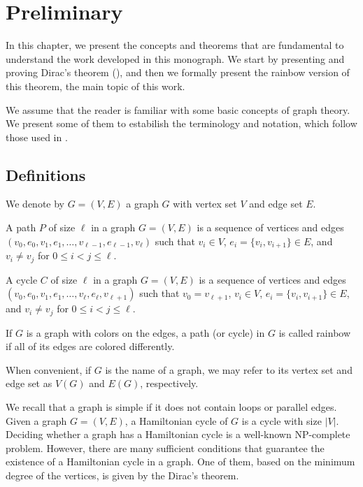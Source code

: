 
\chapter{Preliminary}

In this chapter, we present the concepts and theorems that are fundamental to understand the 
work developed in this monograph. We start by presenting and proving Dirac's theorem
(\cite{dirac1952}), 
and then we formally present the rainbow version of this theorem, the main topic of this work.

We assume that the reader is familiar with some basic concepts of graph theory. We present some 
of them to estabilish the terminology and notation, which follow those used in 
\cite{bondy1976}.

\section{Definitions}

We denote by $G = (V, E)$ a graph $G$ with vertex set $V$ and edge set $E$.

A path $P$ of size $\ell$ in a graph $G = (V, E)$ is a sequence of vertices and edges $(v_0, e_0, v_1, e_1, \ldots, v_{\ell - 1}, e_{\ell - 1}, v_{\ell})$ such that
$v_i \in V$, $e_i = \{v_i, v_{i + 1}\} \in E$, and $v_i \neq v_j$ for $0 \leq i < j \leq \ell$.

A cycle $C$ of size $\ell$ in a graph $G = (V, E)$ is a sequence of vertices and edges $(v_0, e_0, v_1, e_1, \ldots, v_{\ell}, e_{\ell}, v_{\ell + 1})$ such that
$v_{0} = v_{\ell + 1}$, $v_i \in V$, $e_i = \{v_i, v_{i + 1}\} \in E$, and $v_i \neq v_j$ for $0 \leq i < j \leq \ell$.

If $G$ is a graph with colors on the edges, a path (or cycle) in $G$ is called rainbow if all of its edges are colored differently.

When convenient, if $G$ is the name of a graph, we may refer to its vertex set and edge set as $V(G)$ and $E(G)$, respectively.

We recall that a graph is simple if it does not contain loops or parallel edges.
Given a graph $G = (V, E)$, a Hamiltonian cycle of $G$ is a cycle with size $|V|$.
Deciding whether a graph has a Hamiltonian cycle is a well-known NP-complete problem. 
However, there are many sufficient conditions that guarantee the existence of a Hamiltonian cycle in a graph. 
One of them, based on the minimum degree of the vertices, is given by the Dirac's theorem.

